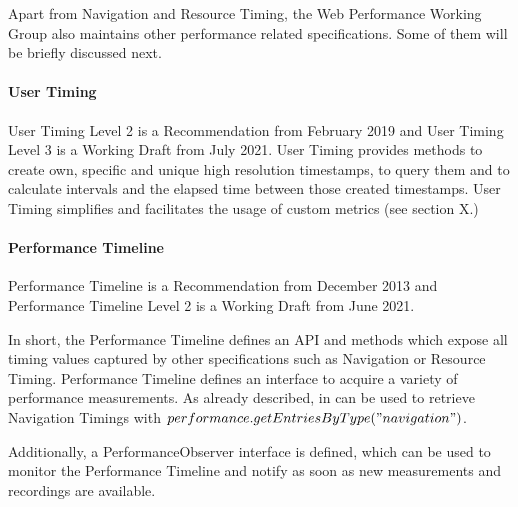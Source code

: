 Apart from Navigation and Resource Timing, the Web Performance Working Group also maintains other performance related specifications.
Some of them will be briefly discussed next.


\paragraph{User Timing}

User Timing Level 2 is a Recommendation from February 2019 and User Timing Level 3 is a Working Draft from July 2021.
User Timing provides methods to create own, specific and unique high resolution timestamps, to query them and to calculate intervals and the elapsed time between those created timestamps.%
User Timing simplifies and facilitates the usage of custom metrics (see section X.)






\paragraph{Performance Timeline}

Performance Timeline is a Recommendation from December 2013 %
and Performance Timeline Level 2 is a Working Draft from June 2021. %

In short, the Performance Timeline defines an API and methods which expose all timing values captured by other specifications such as Navigation or Resource Timing.
Performance Timeline defines an interface to acquire a variety of performance measurements. 
As already described, in can be used to retrieve Navigation Timings with $performance.getEntriesByType("navigation")$.

Additionally, a PerformanceObserver interface is defined, which can be used to monitor the Performance Timeline and notify as soon as new measurements and recordings are available.





